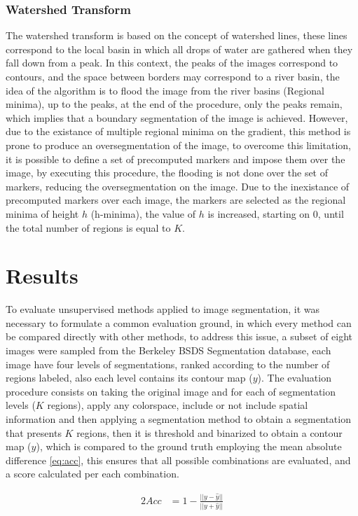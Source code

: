 \documentclass[10pt,twocolumn,letterpaper]{article}
\begin{document}
\subsubsection*{Watershed Transform}
The watershed transform is based on the concept of watershed lines, these lines correspond to the local basin in which all drops of water are gathered when they fall down from a peak. In this context, the peaks of the images correspond to contours, and the space between borders may correspond to a river basin, the idea of the algorithm is to flood the image from the river basins (Regional minima), up to the peaks, at the end of the procedure, only the peaks remain, which implies that a boundary segmentation of the image is achieved. However, due to the existance of multiple regional minima on the gradient, this method is prone to produce an oversegmentation of the image, to overcome this limitation, it is possible to define a set of precomputed markers and impose them over the image, by executing this procedure, the flooding is not done over the set of markers, reducing the oversegmentation on the image. Due to the inexistance of precomputed markers over each image, the markers are selected as the regional minima of height $h$ (h-minima), the value of $h$ is increased, starting on 0, until the total number of regions is equal to $K$.  

\section{Results}
To evaluate unsupervised methods applied to image segmentation, it was necessary to formulate a common evaluation ground, in which every method can be compared directly with other methods, to address this issue, a subset of eight images were sampled from the Berkeley BSDS Segmentation database, each image have four levels of segmentations, ranked according to the number of regions labeled, also each level contains its contour map ($y$). The evaluation procedure consists on taking the original image and for each of segmentation levels ($K$ regions), apply any colorspace, include or not include spatial information and then applying a segmentation method to obtain a segmentation that presents $K$ regions, then it is threshold and binarized to obtain a contour map ($\hat{y}$), which is compared to the ground truth employing the mean absolute difference \eqref{eq:acc}, this ensures that all possible combinations are evaluated, and a score calculated per each combination.

\begin{alignat}{2}
Acc &= 1 - \frac{||y - \hat{y}||}{||y + \hat{y}||} \label{eq:acc}
\end{alignat}
\end{document}
